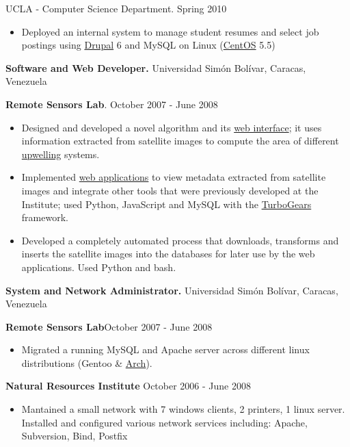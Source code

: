 \documentclass[10pt]{article}
\newcommand{\vitem}{\vspace*{-.4pc}\item}
\begin{document}
 UCLA - Computer Science
Department. \hfill Spring 2010
\begin{itemize}
  \vitem Deployed an internal system to manage student resumes and select job postings using \href{http://drupal.org/}{Drupal} 6 and MySQL on Linux (\href{http://www.centos.org/}{CentOS} 5.5)
\end{itemize}


\flushleft\textbf{Software and Web Developer.} Universidad Simón Bolívar, Caracas, Venezuela

\textbf{Remote Sensors Lab}. \hfill October 2007 - June 2008
\begin{itemize}
  \vitem Designed and developed a novel algorithm and its
  \href{http://ood.cbm.usb.ve/surgencia/sst_modis/mostrar_imagen?img=66}{web
    interface}; it uses information extracted from satellite images to
  compute the area of different
  \href{http://en.wikipedia.org/wiki/Upwelling}{upwelling} systems.

  \vitem Implemented
  \href{http://ood.intecmar.usb.ve/surgencia/sst_modis/}{web
    applications} to view metadata extracted from satellite images and
  integrate other tools that were previously developed at the
  Institute; used Python, JavaScript and MySQL with the
  \href{http://turbogears.org/}{TurboGears} framework.

\vitem Developed a completely automated process that
  downloads, transforms and inserts the satellite images into the
  databases for later use by the web applications. Used Python and bash.
\end{itemize}

\textbf{System and Network Administrator.} Universidad Simón Bolívar, Caracas, Venezuela

\textbf{Remote Sensors Lab}\hfill October 2007 - June 2008
\begin{itemize}
\vitem Migrated a running MySQL and Apache server across different
  linux distributions (Gentoo \& \href{http://www.archlinux.org/}{Arch}).
\end{itemize}

\noindent\textbf{Natural Resources Institute} \hfill October 2006 - June 2008
\begin{itemize}
\vitem Mantained a small network with 7 windows clients, 2 printers, 1
  linux server. Installed and configured various network services including:
  Apache, Subversion, Bind, Postfix
\end{itemize}
\end{document}
